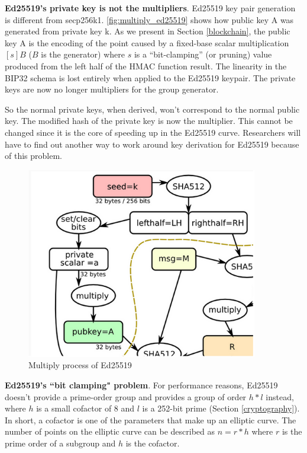 \begin{adjustwidth}{1cm}{}
    \bigskip
    {\textbf{Ed25519's private key is not the multipliers}}. Ed25519 key pair generation is different from secp256k1. \autoref{fig:multiply_ed25519} shows how public key A was generated from private key k. As we present in Section \ref{blockchain}, the public key A is the encoding of the point caused by a fixed-base scalar multiplication $[s]B$ ($B$ is the generator) where $s$ is a “bit-clamping” (or pruning) value produced from the left half of the HMAC function result. The linearity in the BIP32 schema is lost entirely when applied to the Ed25519 keypair. The private keys are now no longer multipliers for the group generator.

    So the normal private keys, when derived, won’t correspond to the normal public key. The modified hash of the private key is now the multiplier. This cannot be changed since it is the core of speeding up in the Ed25519 curve. Researchers will have to find out another way to work around key derivation for Ed25519 because of this problem.

    \bigskip
    \begin{figure}[ht!]
        \centering
        \includegraphics[width=0.9\textwidth]{images/ed25519_generator_multiplier.png}
        \caption[Multiply process of Ed25519]{Multiply process of Ed25519 \cite{learnme}}
        \label{fig:multiply_ed25519}
    \end{figure}


    \bigskip
    {\textbf{Ed25519's “bit clamping" problem}}. For performance reasons, Ed25519 doesn't provide a prime-order group and provides a group of order $h * l$ instead, where $h$ is a small cofactor of 8 and $l$ is a 252-bit prime (Section \ref{cryptography}). In short, a cofactor is one of the parameters that make up an elliptic curve. The number of points on the elliptic curve can be described as $n = r * h$ where $r$ is the prime order of a subgroup and $h$ is the cofactor.


\end{adjustwidth}
